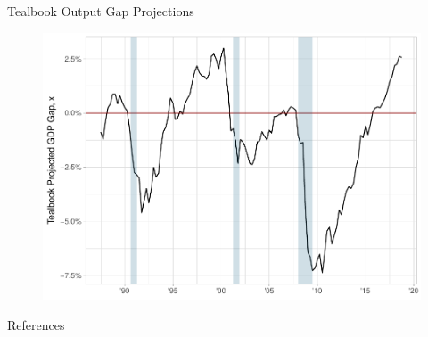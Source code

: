 \documentclass[10pt,aspectratio=169]{beamer}
\begin{document}
    \begin{frame}{Tealbook Output Gap Projections}
        \begin{figure}[!h]\centering
            \begin{minipage}{0.6\textwidth}\centering
                \includegraphics[width=\textwidth]{expected_gap_plot.pdf}
            \end{minipage}
        \end{figure}

    \end{frame}

\begin{frame}[allowframebreaks]{References}
    \footnotesize
    \printbibliography
    \end{frame}
\end{document}
